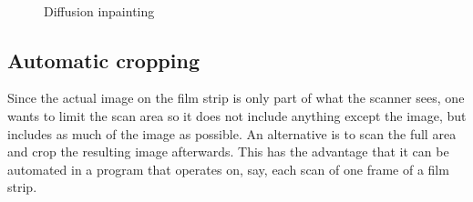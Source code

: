 \documentclass{article}
\begin{document}
\begin{figure}[H]
  \caption{Diffusion inpainting}
  \centering
   \ 
  
\end{figure}

\subsection{Automatic cropping}
\label{ssec:imgproc_crop}

Since the actual image on the film strip is only part of what the scanner sees,
one wants to limit the scan area so it does not include anything except the image,
but includes as much of the image as possible. An alternative is to scan the full area
and crop the resulting image afterwards. This has the advantage that it can be
automated in a program that operates on, say, each scan of one frame of a film strip.
\end{document}

